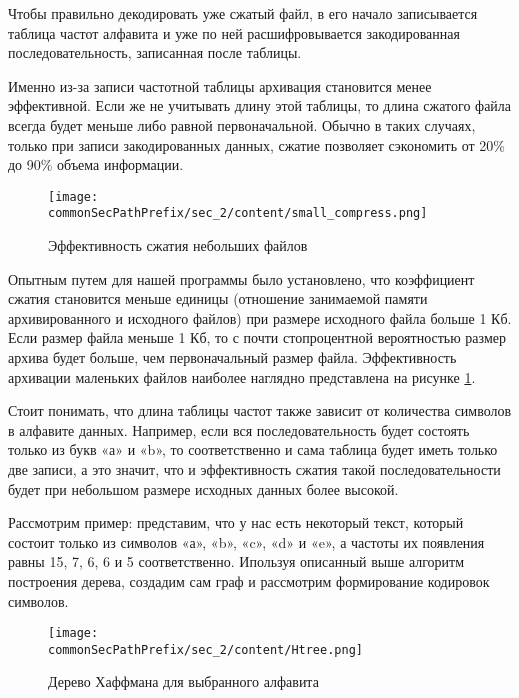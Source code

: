 Чтобы правильно декодировать уже сжатый файл, в его начало записывается таблица частот алфавита и уже по ней расшифровывается закодированная последовательность, записанная после таблицы.



Именно из-за записи частотной таблицы архивация становится менее эффективной. 
Если же не учитывать длину этой таблицы, то длина сжатого файла всегда будет меньше либо равной первоначальной.
Обычно в таких случаях, только при записи закодированных данных, сжатие позволяет сэкономить от 20\% до 90\% объема информации.



\begin{figure}[h]
    \centering
    \texttt{[image: \\commonSecPathPrefix/sec\_2/content/small\_compress.png]}
    \caption{Эффективность сжатия небольших файлов}
    \label{fig:compress}
\end{figure}



Опытным путем для нашей программы было установлено, что коэффициент сжатия становится меньше единицы (отношение занимаемой памяти архивированного и исходного файлов) при размере исходного файла больше 1 Кб.
Если размер файла меньше 1 Кб, то с почти стопроцентной вероятностью размер архива будет больше, чем первоначальный размер файла.
Эффективность архивации маленьких файлов наиболее наглядно представлена на рисунке \ref{fig:compress}.



Стоит понимать, что длина таблицы частот также зависит от количества символов в алфавите данных.
Например, если вся последовательность будет состоять только из букв «а» и «b», то соответственно и сама таблица будет иметь только две записи, а это значит, что и эффективность сжатия такой последовательности будет при небольшом размере исходных данных более высокой.



Рассмотрим пример: представим, что у нас есть некоторый текст, который состоит только из символов «а», «b», «c», «d» и «e», а частоты их появления равны 15, 7, 6, 6 и 5 соответственно. 
Ипользуя описанный выше алгоритм построения дерева\cite{wiki_huf}, создадим сам граф и рассмотрим формирование кодировок символов.

\begin{figure}[h]
    \centering
    \texttt{[image: \\commonSecPathPrefix/sec\_2/content/Htree.png]}
    \caption{Дерево Хаффмана для выбранного алфавита}
    \label{fig:htree}
\end{figure}



